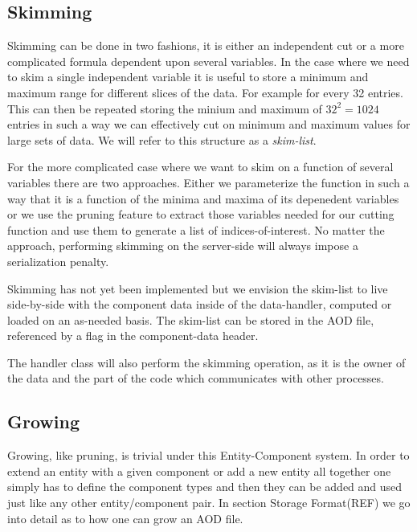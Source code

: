 \documentclass[a4paper]{report}
\begin{document}
\subsection{Skimming}
Skimming can be done in two fashions, it is either an independent cut or a more complicated formula dependent upon several variables.
 In the case where we need to skim a single independent variable it is useful to store a minimum and maximum range for different slices of the data.
  For example for every 32 entries. This can then be repeated storing the minium and maximum of $32^2 = 1024$ entries in such
a way we can effectively cut on minimum and maximum values for large sets of data. We will refer to this structure as a {\em skim-list}.
\par For the more complicated case where we want to skim on a function of several variables there are two approaches.
Either we parameterize the function in such a way that it is a function of the minima and maxima of its depenedent variables
or we use the pruning feature to extract those variables needed for our cutting function and use them to generate a list of indices-of-interest.
No matter the approach, performing skimming on the server-side will always impose a serialization penalty.
\par Skimming has not yet been implemented but we envision the skim-list to live side-by-side with the component data inside of the data-handler, computed or loaded on an as-needed basis.
The skim-list can be stored in the AOD file, referenced by a flag in the component-data header.
\par The handler class will also perform the skimming operation, as it is the owner of the data and the part of the code which communicates with other processes.

\subsection{Growing}
Growing, like pruning, is trivial under this Entity-Component system. In order to extend an entity with a given component or add a new entity all together one simply has to define the component types and then they can be added and used just like
any other entity/component pair. In section Storage Format(REF) we go into detail as to how one can grow an AOD file.
\end{document}
